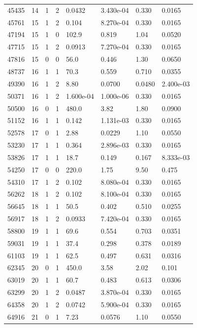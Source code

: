\documentclass[preview]{standalone}
\begin{document}
{{{\begin{tabular}{L{1.2cm}C{1.2cm} C{0.3cm}C{0.5cm} C{1.4cm}C{1.4cm} C{1.4cm}C{1.4cm}}
  45435  &    14  & 1     &  2 &  0.0432  & 3.430e-04  & 0.330 &  0.0165   \\ 
  45761  &    15  & 1     &  2 &  0.104  & 8.270e-04  & 0.330 &  0.0165   \\ 
  47194  &    15  & 1     &  0 &  102.9  & 0.819  & 1.04 &  0.0520   \\ 
  47715  &    15  & 1     &  2 &  0.0913  & 7.270e-04  & 0.330 &  0.0165   \\ 
  47816  &    15  & 0     &  0 &  56.0  & 0.446  & 1.30 &  0.0650   \\ 
  48737  &    16  & 1     &  1 &  70.3  & 0.559  & 0.710 &  0.0355   \\ 
  49390  &    16  & 1     &  2 &  8.80  & 0.0700  & 0.0480 &  2.400e-03   \\ 
  50371  &    16  & 1     &  2 &  1.600e-04  & 1.000e-06  & 0.330 &  0.0165   \\ 
  50500  &    16  & 0     &  1 &  480.0  & 3.82  & 1.80 &  0.0900   \\ 
  51152  &    16  & 1     &  1 &  0.142  & 1.131e-03  & 0.330 &  0.0165   \\ 
  52578  &    17  & 0     &  1 &  2.88  & 0.0229  & 1.10 &  0.0550   \\ 
  53230  &    17  & 1     &  1 &  0.364  & 2.896e-03  & 0.330 &  0.0165   \\ 
  53826  &    17  & 1     &  1 &  18.7  & 0.149  & 0.167 &  8.333e-03   \\ 
  54250  &    17  & 0     &  0 &  220.0  & 1.75  & 9.50 &  0.475   \\ 
  54310  &    17  & 1     &  2 &  0.102  & 8.080e-04  & 0.330 &  0.0165   \\ 
  56262  &    18  & 1     &  2 &  0.102  & 8.100e-04  & 0.330 &  0.0165   \\ 
  56645  &    18  & 1     &  1 &  50.5  & 0.402  & 0.510 &  0.0255   \\ 
  56917  &    18  & 1     &  2 &  0.0933  & 7.420e-04  & 0.330 &  0.0165   \\ 
  58800  &    19  & 1     &  1 &  69.6  & 0.554  & 0.703 &  0.0351   \\ 
  59031  &    19  & 1     &  1 &  37.4  & 0.298  & 0.378 &  0.0189   \\ 
  61103  &    19  & 1     &  1 &  62.5  & 0.497  & 0.631 &  0.0316   \\ 
  62345  &    20  & 0     &  1 &  450.0  & 3.58  & 2.02 &  0.101   \\ 
  63019  &    20  & 1     &  1 &  60.7  & 0.483  & 0.613 &  0.0306   \\ 
  63299  &    20  & 1     &  2 &  0.0487  & 3.870e-04  & 0.330 &  0.0165   \\ 
  64358  &    20  & 1     &  2 &  0.0742  & 5.900e-04  & 0.330 &  0.0165   \\ 
  64916  &    21  & 0     &  1 &  7.23  & 0.0576  & 1.10 &  0.0550   \\ 
\hline 
\end{tabular} 

}}}
\end{document}

